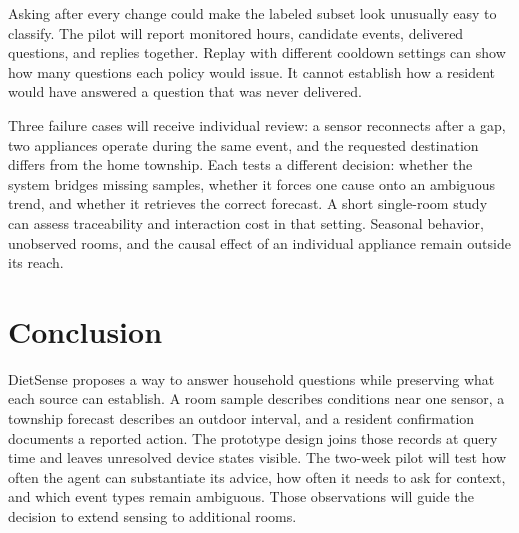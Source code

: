 \documentclass[conference]{IEEEtran}
\begin{document}
Asking after every change could make the labeled subset look unusually easy to classify. The pilot will report monitored hours, candidate events, delivered questions, and replies together. Replay with different cooldown settings can show how many questions each policy would issue. It cannot establish how a resident would have answered a question that was never delivered.

Three failure cases will receive individual review: a sensor reconnects after a gap, two appliances operate during the same event, and the requested destination differs from the home township. Each tests a different decision: whether the system bridges missing samples, whether it forces one cause onto an ambiguous trend, and whether it retrieves the correct forecast. A short single-room study can assess traceability and interaction cost in that setting. Seasonal behavior, unobserved rooms, and the causal effect of an individual appliance remain outside its reach.

\section{Conclusion}\label{sec:conclusion}
DietSense proposes a way to answer household questions while preserving what each source can establish. A room sample describes conditions near one sensor, a township forecast describes an outdoor interval, and a resident confirmation documents a reported action. The prototype design joins those records at query time and leaves unresolved device states visible. The two-week pilot will test how often the agent can substantiate its advice, how often it needs to ask for context, and which event types remain ambiguous. Those observations will guide the decision to extend sensing to additional rooms.
\end{document}
